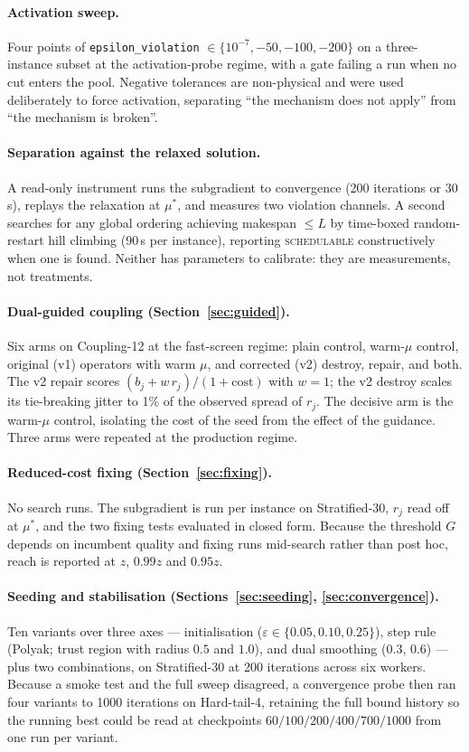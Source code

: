 \documentclass[11pt,a4paper]{article}
\begin{document}
\paragraph{Activation sweep.}
Four points of \texttt{epsilon\_violation} $\in\{10^{-7},-50,-100,-200\}$ on a
three-instance subset at the activation-probe regime, with a gate failing a run
when no cut enters the pool. Negative tolerances are non-physical and were used
deliberately to force activation, separating ``the mechanism does not apply'' from
``the mechanism is broken''.

\paragraph{Separation against the relaxed solution.}
A read-only instrument runs the subgradient to convergence (200 iterations or
30\,s), replays the relaxation at $\mu^\ast$, and measures two violation channels.
A second searches for any global ordering achieving makespan $\le L$ by time-boxed
random-restart hill climbing (90\,s per instance), reporting \textsc{schedulable}
constructively when one is found. Neither has parameters to calibrate: they are
measurements, not treatments.

\paragraph{Dual-guided coupling (Section~\ref{sec:guided}).}
Six arms on Coupling-12 at the fast-screen regime: plain control, warm-$\mu$
control, original (v1) operators with warm $\mu$, and corrected (v2) destroy,
repair, and both. The v2 repair scores $(b_j+w\,r_j)/(1+\text{cost})$ with $w=1$;
the v2 destroy scales its tie-breaking jitter to 1\% of the observed spread of
$r_j$. The decisive arm is the warm-$\mu$ control, isolating the cost of the seed
from the effect of the guidance. Three arms were repeated at the production
regime.

\paragraph{Reduced-cost fixing (Section~\ref{sec:fixing}).}
No search runs. The subgradient is run per instance on Stratified-30, $r_j$ read
off at $\mu^\ast$, and the two fixing tests evaluated in closed form. Because the
threshold $G$ depends on incumbent quality and fixing runs mid-search rather than
post hoc, reach is reported at $z$, $0.99z$ and $0.95z$.

\paragraph{Seeding and stabilisation (Sections~\ref{sec:seeding},
\ref{sec:convergence}).}
Ten variants over three axes --- initialisation
($\varepsilon\in\{0.05,0.10,0.25\}$), step rule (Polyak; trust region with radius
$0.5$ and $1.0$), and dual smoothing ($0.3$, $0.6$) --- plus two combinations, on
Stratified-30 at 200 iterations across six workers. Because a smoke test and the
full sweep disagreed, a convergence probe then ran four variants to 1000
iterations on Hard-tail-4, retaining the full bound history so the running best
could be read at checkpoints $60/100/200/400/700/1000$ from one run per variant.
\end{document}
